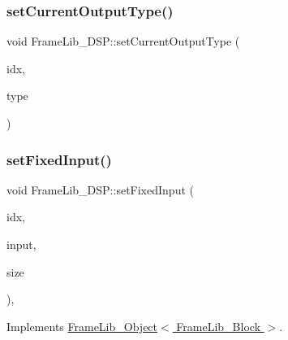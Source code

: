 \subsubsection{\texorpdfstring{set\+Current\+Output\+Type()}{setCurrentOutputType()}}
{\footnotesize\ttfamily void Frame\+Lib\+\_\+\+D\+S\+P\+::set\+Current\+Output\+Type (\begin{DoxyParamCaption}\item[{unsigned long}]{idx,  }\item[{\hyperlink{_frame_lib___types_8h_ad495a9f61af7fff07d7e97979d1ab854}{Frame\+Type}}]{type }\end{DoxyParamCaption})\hspace{0.3cm}{\ttfamily [protected]}}

\mbox{\label{class_frame_lib___d_s_p_a426afa0cf5d8f5c625619da2ccbf9be4}} 
\subsubsection{\texorpdfstring{set\+Fixed\+Input()}{setFixedInput()}}
{\footnotesize\ttfamily void Frame\+Lib\+\_\+\+D\+S\+P\+::set\+Fixed\+Input (\begin{DoxyParamCaption}\item[{unsigned long}]{idx,  }\item[{double $\ast$}]{input,  }\item[{unsigned long}]{size }\end{DoxyParamCaption})\hspace{0.3cm}{\ttfamily [final]}, {\ttfamily [virtual]}}



Implements \hyperlink{class_frame_lib___object_a0d3bed42a21ebf248366f4457722beff}{Frame\+Lib\+\_\+\+Object$<$ Frame\+Lib\+\_\+\+Block $>$}.

\mbox{\label{class_frame_lib___d_s_p_ae88480e015d70507fd1f7853fc17ffa2}} 
